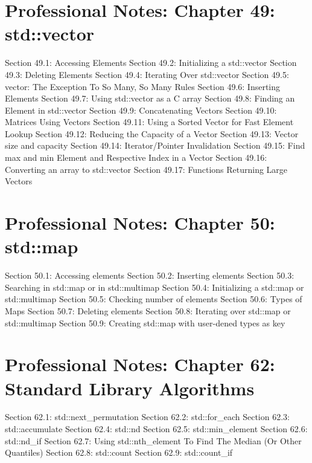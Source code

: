 \hypertarget{professional-notes-chapter-49-stdvector}{%
\chapter{Professional Notes: Chapter 49:
std::vector}\label{professional-notes-chapter-49-stdvector}}

Section 49.1: Accessing Elements Section 49.2: Initializing a
std::vector Section 49.3: Deleting Elements Section 49.4: Iterating Over
std::vector Section 49.5: vector: The Exception To So Many, So Many
Rules Section 49.6: Inserting Elements Section 49.7: Using std::vector
as a C array Section 49.8: Finding an Element in std::vector Section
49.9: Concatenating Vectors Section 49.10: Matrices Using Vectors
Section 49.11: Using a Sorted Vector for Fast Element Lookup Section
49.12: Reducing the Capacity of a Vector Section 49.13: Vector size and
capacity Section 49.14: Iterator/Pointer Invalidation Section 49.15:
Find max and min Element and Respective Index in a Vector Section 49.16:
Converting an array to std::vector Section 49.17: Functions Returning
Large Vectors

\hypertarget{professional-notes-chapter-50-stdmap}{%
\chapter{Professional Notes: Chapter 50:
std::map}\label{professional-notes-chapter-50-stdmap}}

Section 50.1: Accessing elements Section 50.2: Inserting elements
Section 50.3: Searching in std::map or in std::multimap Section 50.4:
Initializing a std::map or std::multimap Section 50.5: Checking number
of elements Section 50.6: Types of Maps Section 50.7: Deleting elements
Section 50.8: Iterating over std::map or std::multimap Section 50.9:
Creating std::map with user-dened types as key

\hypertarget{professional-notes-chapter-62-standard-library-algorithms}{%
\chapter{Professional Notes: Chapter 62: Standard Library
Algorithms}\label{professional-notes-chapter-62-standard-library-algorithms}}

Section 62.1: std::next\_permutation Section 62.2: std::for\_each
Section 62.3: std::accumulate Section 62.4: std::nd Section 62.5:
std::min\_element Section 62.6: std::nd\_if Section 62.7: Using
std::nth\_element To Find The Median (Or Other Quantiles) Section 62.8:
std::count Section 62.9: std::count\_if

